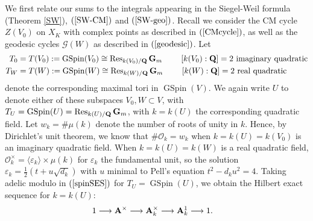 \documentclass{amsart}
\theoremstyle{definition}
\theoremstyle{definition}
\theoremstyle{definition}
\begin{document}
We first relate our sums to the integrals appearing in the Siegel-Weil formula (Theorem \ref{SW}), $(\ref{SW-CM})$ and $(\ref{SW-geo})$. 
Recall we consider the CM cycle $Z(V_0)$ on $X_K$ with complex points as described in $(\ref{CMcycle})$,
as well as the geodesic cycles $\mathcal{G}(W)$ as described in $(\ref{geodesic})$. Let 
\begin{equation*}\begin{aligned} T_0 &= T(V_0) := \operatorname{GSpin}(V_0) \cong \operatorname{Res}_{k(V_0)/{\bf{Q}}} {\bf{G}}_m 
\quad \quad \text{ $[k(V_0): {\bf{Q}}]=2$ imaginary quadratic} \\
T_W &= T(W) :=  \operatorname{GSpin}(W) \cong \operatorname{Res}_{k(W)/{\bf{Q}}} {\bf{G}}_m 
\quad \quad \text{ $[k(W):{\bf{Q}}] =2$ real quadratic} \end{aligned}\end{equation*}
denote the corresponding maximal tori in $\operatorname{GSpin}(V)$.
We again write $U$ to denote either of these subspaces $V_0, W \subset V$, 
with $T_U = \operatorname{GSpin}(U) = \operatorname{Res}_{k(U)/{\bf{Q}}} {\bf{G}}_m$, with $k=k(U)$ the corresponding quadratic field. 
Let $w_k = \# \mu(k)$ denote the number of roots of unity in $k$.
Hence, by Dirichlet's unit theorem, we know that $\# \mathcal{O}_k = w_k$ when $k = k(U) = k(V_0)$ is an imaginary quadratic field. 
When $k = k(U)= k(W)$ is a real quadratic field, $\mathcal{O}_k^{\times} = \langle \varepsilon_k \rangle \times \mu(k)$ for $\varepsilon_k$ the fundamental unit, 
so the solution $\varepsilon_k = \frac{1}{2}(t + u \sqrt{d_k})$ with $u$ minimal to Pell's equation $t^2 - d_k u^2 = 4$. 
Taking adelic modulo in $(\ref{spinSES})$ for $T_U = \operatorname{GSpin}(U)$, we obtain the Hilbert exact sequence for $k=k(U)$:
\begin{align}\label{HilbertSES} &1 \longrightarrow {\bf{A}}^{\times} \longrightarrow {\bf{A}}_{k}^{\times} \longrightarrow {\bf{A}}_{k}^{1} \longrightarrow 1. \end{align}
\end{document}
